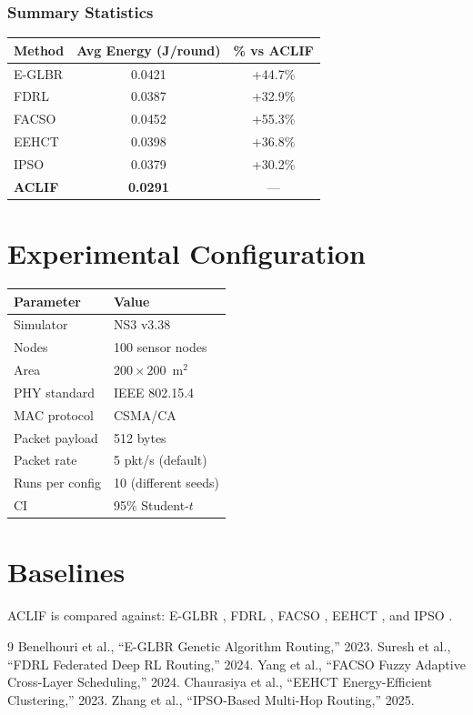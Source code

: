 \documentclass[a4paper,12pt]{article}
\begin{document}
\subsubsection*{Summary Statistics}
\begin{tabular}{lcc}
\toprule
Method & Avg Energy (J/round) & \% vs ACLIF \\
\midrule
E-GLBR & 0.0421 & +44.7\% \\
FDRL   & 0.0387 & +32.9\% \\
FACSO  & 0.0452 & +55.3\% \\
EEHCT  & 0.0398 & +36.8\% \\
IPSO   & 0.0379 & +30.2\% \\
\textbf{ACLIF} & \textbf{0.0291} & --- \\
\bottomrule
\end{tabular}

\section{Experimental Configuration}
\begin{tabular}{ll}
\toprule
\textbf{Parameter} & \textbf{Value} \\
\midrule
Simulator      & NS3 v3.38 \\
Nodes          & 100 sensor nodes \\
Area           & $200 \times 200$~m$^2$ \\
PHY standard   & IEEE 802.15.4 \\
MAC protocol   & CSMA/CA \\
Packet payload & 512 bytes \\
Packet rate    & 5 pkt/s (default) \\
Runs per config & 10 (different seeds) \\
CI             & 95\% Student-$t$ \\
\bottomrule
\end{tabular}

\section{Baselines}
ACLIF is compared against: E-GLBR \cite{Benelhouri2023}, FDRL \cite{Suresh2024},
FACSO \cite{Yang2024204}, EEHCT \cite{Chaurasiya202325941}, and IPSO \cite{Zhang2025}.

\begin{thebibliography}{9}
 Benelhouri et al., ``E-GLBR Genetic Algorithm Routing,'' 2023.
 Suresh et al., ``FDRL Federated Deep RL Routing,'' 2024.
 Yang et al., ``FACSO Fuzzy Adaptive Cross-Layer Scheduling,'' 2024.
 Chaurasiya et al., ``EEHCT Energy-Efficient Clustering,'' 2023.
 Zhang et al., ``IPSO-Based Multi-Hop Routing,'' 2025.
\end{thebibliography}
\end{document}

